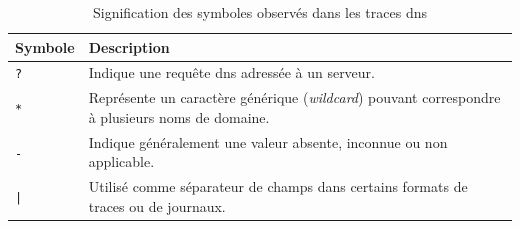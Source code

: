 \documentclass[12pt, a4paper]{report}
\begin{document}
	\begin{table}[ht]
		\centering
		\caption{Signification des symboles observés dans les traces \gls{dns}}
		\label{tab:dns-symbols}
		\begin{tabular}{p{3cm} p{10cm}}
			\toprule
			\textbf{Symbole} & \textbf{Description} \\
			\midrule
			\texttt{?} & Indique une requête \gls{dns} adressée à un serveur. \\
			\texttt{*} & Représente un caractère générique (\textit{wildcard}) pouvant correspondre à plusieurs noms de domaine. \\
			\texttt{-} & Indique généralement une valeur absente, inconnue ou non applicable. \\
			\texttt{|} & Utilisé comme séparateur de champs dans certains formats de traces ou de journaux. \\
			\bottomrule
		\end{tabular}
	\end{table}

	\newpage


	\makeutbmbackcover{}
\end{document}
